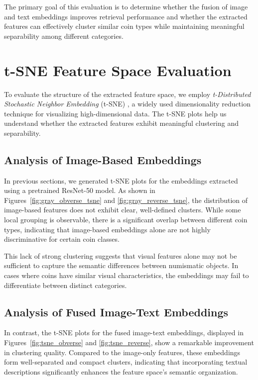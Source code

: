 \documentclass[nolibertine, english, algorithm, nomencl, minted]{ttlab-qualify}
\begin{document}
The primary goal of this evaluation is to determine whether the fusion of image and text embeddings improves retrieval 
performance and whether the extracted features can effectively cluster similar coin types while maintaining meaningful 
separability among different categories.

\section{t-SNE Feature Space Evaluation}
\label{sec:tsne_eval}

To evaluate the structure of the extracted feature space, we employ 
\textit{t-Distributed Stochastic Neighbor Embedding} (t-SNE) \cite{van2008visualizing}, a widely used dimensionality 
reduction technique for visualizing high-dimensional data. The t-SNE plots help us understand whether the extracted 
features exhibit meaningful clustering and separability.

\subsection{Analysis of Image-Based Embeddings}
\label{subsec:tsne_image}

In previous sections, we generated t-SNE plots for the embeddings extracted using a pretrained ResNet-50 model. 
As shown in Figures~\ref{fig:gray_obverse_tsne} and \ref{fig:gray_reverse_tsne}, the distribution of image-based features 
does not exhibit clear, well-defined clusters. While some local grouping is observable, there is a significant overlap between 
different coin types, indicating that image-based embeddings alone are not highly discriminative for certain coin classes.

This lack of strong clustering suggests that visual features alone may not be sufficient to capture the 
semantic differences between numismatic objects. In cases where coins have similar visual characteristics, 
the embeddings may fail to differentiate between distinct categories.

\subsection{Analysis of Fused Image-Text Embeddings}
\label{subsec:tsne_fused}

In contrast, the t-SNE plots for the fused image-text embeddings, displayed in 
Figures~\ref{fig:tsne_obverse} and \ref{fig:tsne_reverse}, show a remarkable improvement in clustering quality. 
Compared to the image-only features, these embeddings form well-separated and compact clusters, 
indicating that incorporating textual descriptions significantly enhances the feature space's semantic organization.
\end{document}
